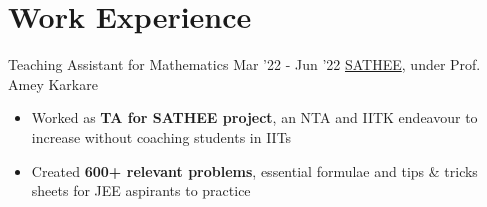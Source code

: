 \section*{\sc Work Experience}
\vspace{-2mm}
\hrulefill
\vspace{1mm}

\excventry
{Teaching Assistant for Mathematics}
{Mar '22 - Jun '22}
{\href{https://satheejee.prutor.ai/}{SATHEE}, under Prof. Amey Karkare}
{
  \begin{itemize}
    \item Worked as \textbf{TA for SATHEE project}, an NTA and IITK endeavour to increase without coaching students in IITs
    \item Created \textbf{600+ relevant problems}, essential formulae and tips \& tricks sheets for JEE aspirants to practice%
  \end{itemize}
}
\vspace{-2mm}